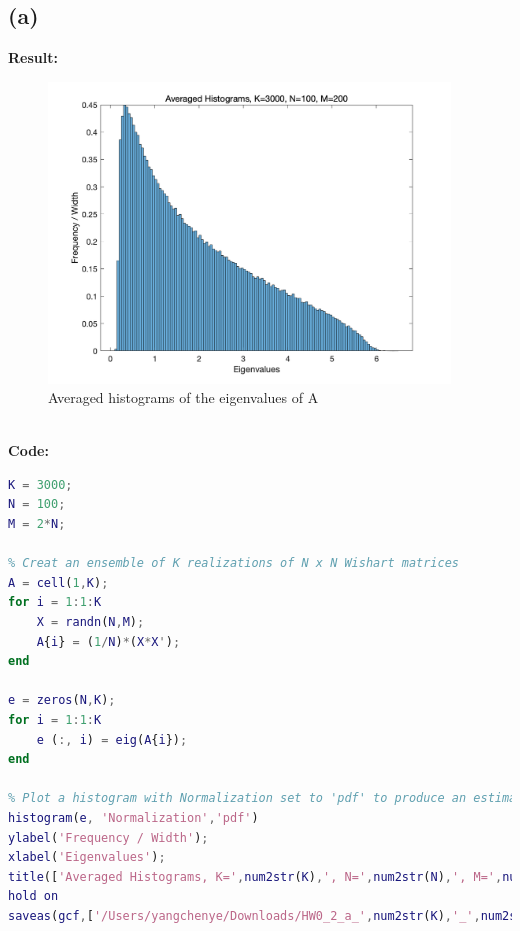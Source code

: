\documentclass[twoside]{homework}
\begin{document}
\subsection*{(a)}
\textbf{Result:}
\begin{figure}[!h]
\begin{center}
\includegraphics[width=0.95\textwidth]{HW0_2_a_3000_100_200.png}
\end{center}
\caption{Averaged histograms of the eigenvalues of A}
\label{fig:HW0_2_a}
\end{figure}\\
\textbf{Code:}\\
\begin{lstlisting}[language={Matlab}]
K = 3000;
N = 100;
M = 2*N;

% Creat an ensemble of K realizations of N x N Wishart matrices
A = cell(1,K);
for i = 1:1:K
    X = randn(N,M);
    A{i} = (1/N)*(X*X');
end

e = zeros(N,K);
for i = 1:1:K
    e (:, i) = eig(A{i});
end

% Plot a histogram with Normalization set to 'pdf' to produce an estimation of the probability density function.
histogram(e, 'Normalization','pdf')
ylabel('Frequency / Width');
xlabel('Eigenvalues');
title(['Averaged Histograms, K=',num2str(K),', N=',num2str(N),', M=',num2str(M)]);
hold on
saveas(gcf,['/Users/yangchenye/Downloads/HW0_2_a_',num2str(K),'_',num2str(N),'_',num2str(M),'.png'])
\end{lstlisting}
\end{document}
